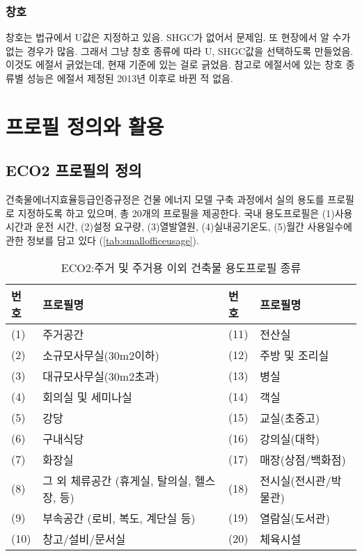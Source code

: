 \subsubsection{창호}
창호는 법규에서 U값은 지정하고 있음. SHGC가 없어서 문제임. 또 현장에서 알 수가 없는 경우가 많음. 그래서 그냥 창호 종류에 따라 U, SHGC값을 선택하도록 만들었음.
이것도 에절서 긁었는데, 현재 기준에 있는 걸로 긁었음. 참고로 에절서에 있는 창호 종류별 성능은 에절서 제정된 2013년 이후로 바뀐 적 없음.



\section{프로필 정의와 활용}
\subsection{ECO2 프로필의 정의}
건축물에너지효율등급인증규정은 건물 에너지 모델 구축 과정에서 실의 용도를 프로필로 지정하도록 하고 있으며, 총 20개의 프로필을 제공한다\cite{law:usageprofile}. 국내 용도프로필은 (1)사용시간과 운전 시간, (2)설정 요구량, (3)열발열원, (4)실내공기온도, (5)월간 사용일수에 관한 정보를 담고 있다 (\cref{tab:smallofficeusage}). 

\begin{table}[ht]
  \caption{ECO2:주거 및 주거용 이외 건축물 용도프로필 종류}
  \label{tbl:eco2profiles}  
  \centering
  \begin{tabular}{llll}
    \toprule
    번호 & 프로필명 & 번호 & 프로필명 \\ \midrule
    (1) & 주거공간             & (11) & 전산실 \\ \midrule
    (2) & 소규모사무실(30m2이하) & (12) & 주방 및 조리실 \\ \midrule
    (3) & 대규모사무실(30m2초과) & (13) & 병실 \\ \midrule
    (4) & 회의실 및 세미나실     & (14) & 객실 \\ \midrule
    (5) & 강당                & (15) & 교실(초중고) \\ \midrule
    (6) & 구내식당             & (16) & 강의실(대학) \\ \midrule
    (7) & 화장실               & (17) & 매장(상점/백화점) \\ \midrule
    (8) & 그 외 체류공간 (휴게실, 탈의실, 헬스장, 등) & (18) & 전시실(전시관/박물관) \\ \midrule
    (9) & 부속공간 (로비, 복도, 계단실 등) & (19) & 열람실(도서관) \\ \midrule
    (10) & 창고/설비/문서실     & (20) & 체육시설 \\ \bottomrule
  \end{tabular}
\end{table}



